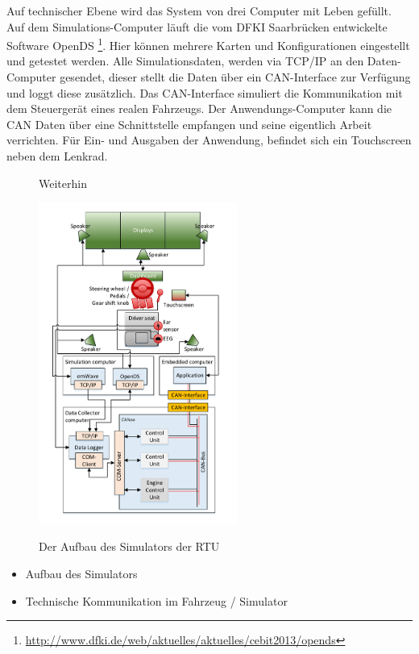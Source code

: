 {Auf technischer Ebene wird das System von drei Computer mit Leben gefüllt. Auf dem Simulations-Computer läuft die vom DFKI Saarbrücken entwickelte Software OpenDS \footnote{\url{http://www.dfki.de/web/aktuelles/aktuelles/cebit2013/opends}}. Hier können mehrere Karten und Konfigurationen eingestellt und getestet werden. Alle Simulationsdaten, werden via TCP/IP an den Daten-Computer gesendet, dieser stellt die Daten über ein CAN-Interface zur Verfügung und loggt diese zusätzlich. Das CAN-Interface simuliert die Kommunikation mit dem Steuergerät eines realen Fahrzeugs. Der Anwendungs-Computer kann die CAN Daten über eine Schnittstelle empfangen und seine eigentlich Arbeit verrichten. Für Ein- und Ausgaben der Anwendung, befindet sich ein Touchscreen neben dem Lenkrad.
\begin{figure}[h]Weiterhin 
  \begin{center}
    \includegraphics[width=6.5cm]{img/architecture}
    \label{fig:architecure}
    \caption[Aufbau des Simulators]{Der Aufbau des Simulators der \acl{RTU}}
  \end{center}
\end{figure}

\begin{itemize}
  \item Aufbau des Simulators
  \item Technische Kommunikation im Fahrzeug / Simulator \cite{serial}
\end{itemize}



}
